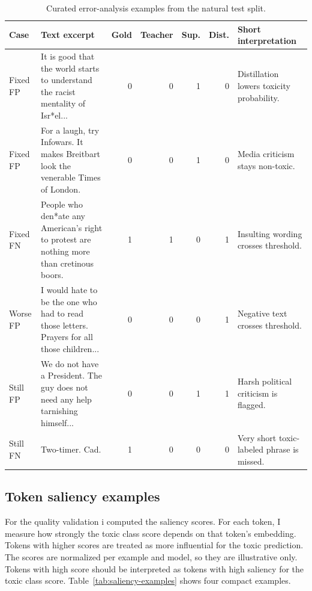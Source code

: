 \documentclass[pdflatex,sn-mathphys-num]{sn-jnl}
\begin{document}
\begin{table}[htbp]
\caption{Curated error-analysis examples from the natural test split.}
\label{tab:error-analysis-examples}
\centering
\tiny
\setlength{\tabcolsep}{1.5pt}
\begin{tabular}{p{1.8cm}p{4.0cm}rrrrp{3.0cm}}
\toprule
Case & Text excerpt & Gold & Teacher & Sup. & Dist. & Short interpretation \\
\midrule
Fixed FP & It is good that the world starts to understand the racist mentality of Isr*el... & 0 & 0 & 1 & 0 & Distillation lowers toxicity probability. \\
Fixed FP & For a laugh, try Infowars. It makes Breitbart look the venerable Times of London. & 0 & 0 & 1 & 0 & Media criticism stays non-toxic. \\
Fixed FN & People who den*ate any American's right to protest are nothing more than cretinous boors. & 1 & 1 & 0 & 1 & Insulting wording crosses threshold. \\
Worse FP & I would hate to be the one who had to read those letters. Prayers for all those children... & 0 & 0 & 0 & 1 & Negative text crosses threshold. \\
Still FP & We do not have a President. The guy does not need any help tarnishing himself... & 0 & 0 & 1 & 1 & Harsh political criticism is flagged. \\
Still FN & Two-timer. Cad. & 1 & 0 & 0 & 0 & Very short toxic-labeled phrase is missed. \\
\bottomrule
\end{tabular}
\end{table}

\subsection{Token saliency examples}

For the quality validation i computed the saliency scores.
For each token, I measure how strongly the toxic class score depends on that token’s embedding.
Tokens with higher scores are treated as more influential for the toxic prediction.
The scores are normalized per example and model, so they are illustrative only.
Tokens with high score should be interpreted as tokens with high saliency for the toxic class score.
Table~\ref{tab:saliency-examples} shows four compact examples.
\end{document}
